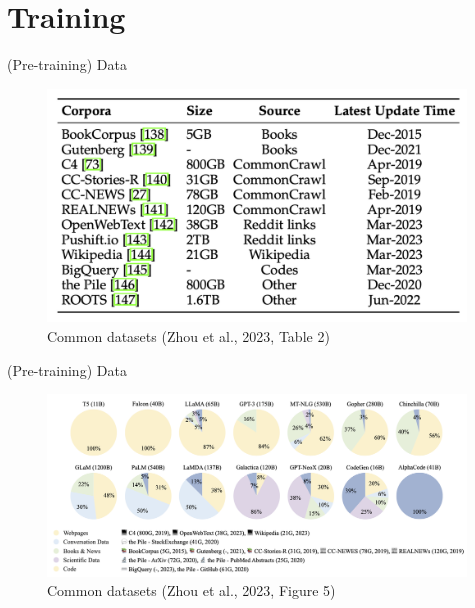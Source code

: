 \documentclass[10pt]{beamer}
\begin{document}
\section{Training}
\frame{\sectionpage}

\begin{frame}{(Pre-training) Data}

\begin{figure}[h]
\centering
\includegraphics[width=0.99\textwidth]{fig/zhou_2023_tab2}
\caption{Common datasets (Zhou et al., 2023, Table 2)}
\end{figure}


\end{frame}

\begin{frame}{(Pre-training) Data}

\begin{figure}[h]
\centering
\includegraphics[width=0.99\textwidth]{fig/zhou_2023_fig5}
\caption{Common datasets (Zhou et al., 2023, Figure 5)}
\end{figure}


\end{frame}
\end{document}
